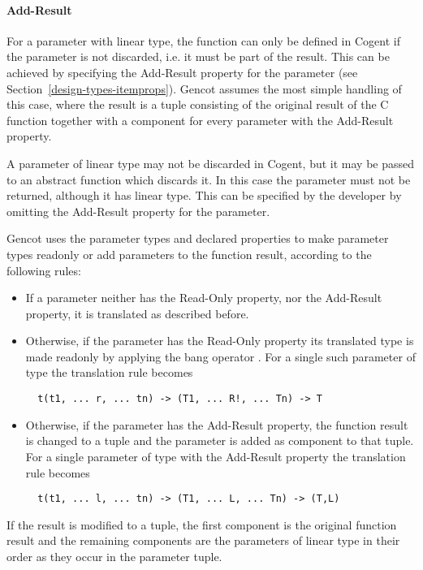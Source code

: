 \paragraph{Add-Result}

For a parameter with linear type, the function can only be defined in Cogent if the parameter is not discarded,
i.e. it must be part of the result. This can be achieved by specifying the Add-Result property for the 
parameter (see Section~\ref{design-types-itemprops}). Gencot assumes the most simple handling of this case, where the result
is a tuple consisting of the original result of the C function together with a component for every parameter
with the Add-Result property. 

A parameter of linear type may not be discarded in Cogent, but it may be passed to an abstract function which discards
it. In this case the parameter must not be returned, although it has linear type. This can be specified by the 
developer by omitting the Add-Result property for the parameter.

Gencot uses the parameter types and declared properties to make parameter types readonly or
add parameters to the function result, according to the following rules:
\begin{itemize}
\item If a parameter neither has the Read-Only property, nor the Add-Result property, it is translated as described before.
\item Otherwise, if the parameter has the Read-Only property
its translated type is made readonly by applying the
bang operator \code{!}. For a single such parameter of type  the translation rule becomes
\begin{verbatim}
  t(t1, ... r, ... tn) -> (T1, ... R!, ... Tn) -> T
\end{verbatim}
\item Otherwise, if the parameter has the Add-Result property, the function result is changed to a tuple and the 
parameter is added as component to that tuple.
For a single parameter of type  with the Add-Result property the translation rule becomes
\begin{verbatim}
  t(t1, ... l, ... tn) -> (T1, ... L, ... Tn) -> (T,L)
\end{verbatim}
\end{itemize}

If the result is modified to a tuple, the first component is the original function result and the remaining components
are the parameters of linear type in their order as they occur in the parameter tuple.

